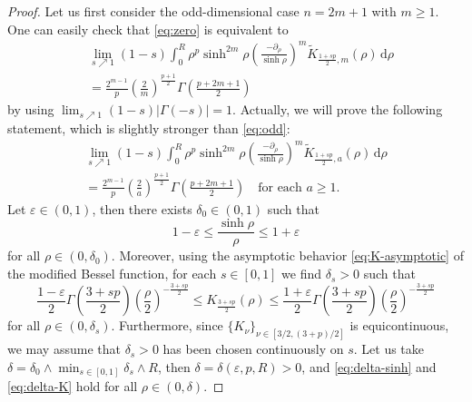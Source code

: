 \documentclass[11pt]{amsart}
\theoremstyle{plain}
\theoremstyle{definition}
\numberwithin{equation}{section}
\begin{document}
\begin{proof}
Let us first consider the odd-dimensional case $n=2m+1$ with $m \geq 1$. One can easily check that \eqref{eq:zero} is equivalent to
\begin{equation} \label{eq:odd}
\begin{split}
&\lim_{s \nearrow 1} (1-s) \int_{0}^{R} \rho^{p} \sinh^{2m} \rho \left( \frac{-\partial_{\rho}}{\sinh \rho} \right)^{m} \widetilde{K}_{\frac{1+sp}{2},m}(\rho) \, \mathrm{d}\rho \\
&= \frac{2^{m-1}}{p} \left( \frac{2}{m} \right)^{\frac{p+1}{2}} \Gamma\left( \frac{p+2m+1}{2} \right)
\end{split}
\end{equation}
by using $\lim_{s \nearrow 1} (1-s)|\Gamma(-s)| = 1$. Actually, we will prove the following statement, which is slightly stronger than \eqref{eq:odd}:
\begin{equation} \label{eq:zero-odd}
\begin{split}
\lim_{s \nearrow 1} (1-s) \int_{0}^{R} \rho^{p} \sinh^{2m} \rho \left( \frac{-\partial_{\rho}}{\sinh \rho} \right)^{m} \widetilde{K}_{\frac{1+sp}{2},a}(\rho) \, \mathrm{d}\rho \\
= \frac{2^{m-1}}{p} \left( \frac{2}{a} \right)^{\frac{p+1}{2}} \Gamma\left( \frac{p+2m+1}{2} \right) \quad\text{for each } a \geq 1.
\end{split}
\end{equation}
Let $\varepsilon \in (0,1)$, then there exists $\delta_{0} \in (0,1)$ such that
\begin{equation} \label{eq:delta-sinh}
1-\varepsilon \leq \frac{\sinh \rho}{\rho} \leq 1+\varepsilon
\end{equation}
for all $\rho \in (0, \delta_{0})$. Moreover, using the asymptotic behavior \eqref{eq:K-asymptotic} of the modified Bessel function, for each $s \in [0,1]$ we find $\delta_{s} > 0$ such that
\begin{equation} \label{eq:delta-K}
\frac{1-\varepsilon}{2} \Gamma\left( \frac{3+sp}{2} \right)\left( \frac{\rho}{2} \right)^{-\frac{3+sp}{2}} \leq K_{\frac{3+sp}{2}}(\rho) \leq \frac{1+\varepsilon}{2} \Gamma\left( \frac{3+sp}{2} \right)\left( \frac{\rho}{2} \right)^{-\frac{3+sp}{2}}
\end{equation}
for all $\rho \in (0, \delta_{s})$. Furthermore, since $\{K_{\nu}\}_{\nu \in [3/2, (3+p)/2]}$ is equicontinuous, we may assume that $\delta_{s}>0$ has been chosen continuously on $s$. Let us take $\delta = \delta_{0} \land \min_{s \in [0,1]} \delta_{s} \land R$, then $\delta = \delta(\varepsilon, p, R) > 0$, and \eqref{eq:delta-sinh} and \eqref{eq:delta-K} hold for all $\rho \in (0, \delta)$.


\end{proof}
\end{document}

